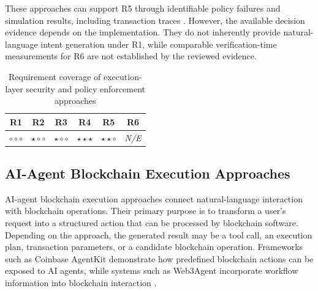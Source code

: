 These approaches can support R5 through identifiable policy
failures and simulation results, including transaction traces
\cite{safeSmartAccountGuards2026,
tenderlyTransactionSimulation2026}. However, the available
decision evidence depends on the implementation. They do
not inherently provide natural-language intent generation
under R1, while comparable verification-time measurements
for R6 are not established by the reviewed evidence.

\begin{table}[H]
\centering
\renewcommand{\arraystretch}{1.3}
\begin{tabular}{cccccc}
\hline
\textbf{R1} & \textbf{R2} & \textbf{R3} &
\textbf{R4} & \textbf{R5} & \textbf{R6} \\
\hline

$\circ\circ\circ$ &
$\star\circ\circ$ &
$\star\circ\circ$ &
$\star\star\star$ &
$\star\star\circ$ &
\textit{N/E} \\

\hline
\end{tabular}
\caption{Requirement coverage of execution-layer security
and policy enforcement approaches}
\label{tab:req_execution_layer}
\end{table}




\subsection{AI-Agent Blockchain Execution Approaches}
\label{subsec:ai_agent_blockchain_execution}

AI-agent blockchain execution approaches connect natural-language
interaction with blockchain operations. Their primary purpose is
to transform a user's request into a structured action that can
be processed by blockchain software. Depending on the approach,
the generated result may be a tool call, an execution plan,
transaction parameters, or a candidate blockchain operation.
Frameworks such as Coinbase AgentKit demonstrate how predefined
blockchain actions can be exposed to AI agents, while systems
such as Web3Agent incorporate workflow information into
blockchain interaction
\cite{coinbaseAgentKit2026,TODO_Web3Agent}.

